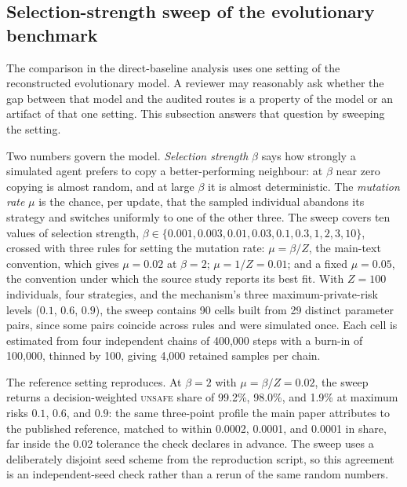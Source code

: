 \documentclass[sigconf,anonymous]{aamas}
\newcommand{\Unsafe}{\textsc{unsafe}}
\begin{document}
\subsection{Selection-strength sweep of the evolutionary benchmark}
\label{app:egt-beta}

The comparison in the direct-baseline analysis uses one setting of the
reconstructed evolutionary model. A reviewer may reasonably ask whether the
gap between that model and the audited routes is a property of the model or an
artifact of that one setting. This subsection answers that question by
sweeping the setting.

Two numbers govern the model. \emph{Selection strength} $\beta$ says how
strongly a simulated agent prefers to copy a better-performing neighbour: at
$\beta$ near zero copying is almost random, and at large $\beta$ it is almost
deterministic. The \emph{mutation rate} $\mu$ is the chance, per update, that
the sampled individual abandons its strategy and switches uniformly to one of
the other three. The sweep covers ten values of selection strength,
$\beta \in \{0.001, 0.003, 0.01, 0.03, 0.1, 0.3, 1, 2, 3, 10\}$, crossed with
three rules for setting the mutation rate: $\mu = \beta/Z$, the main-text
convention, which gives $\mu = 0.02$ at $\beta = 2$; $\mu = 1/Z = 0.01$; and a
fixed $\mu = 0.05$, the convention under which the source study reports its
best fit. With $Z = 100$ individuals, four strategies, and the mechanism's
three maximum-private-risk levels ($0.1$, $0.6$, $0.9$), the sweep contains
90 cells built from 29 distinct parameter pairs, since some pairs coincide
across rules and were simulated once. Each cell is estimated from four
independent chains of 400{,}000 steps with a burn-in of 100{,}000, thinned by
100, giving 4{,}000 retained samples per chain.

The reference setting reproduces. At $\beta = 2$ with $\mu = \beta/Z = 0.02$,
the sweep returns a decision-weighted \Unsafe{} share of 99.2\%, 98.0\%, and
1.9\% at maximum risks $0.1$, $0.6$, and $0.9$: the same three-point profile
the main paper attributes to the published reference, matched to within
0.0002, 0.0001, and 0.0001 in share, far inside the 0.02 tolerance the check
declares in advance. The sweep uses a deliberately disjoint seed scheme from
the reproduction script, so this agreement is an independent-seed check rather
than a rerun of the same random numbers.
\end{document}
